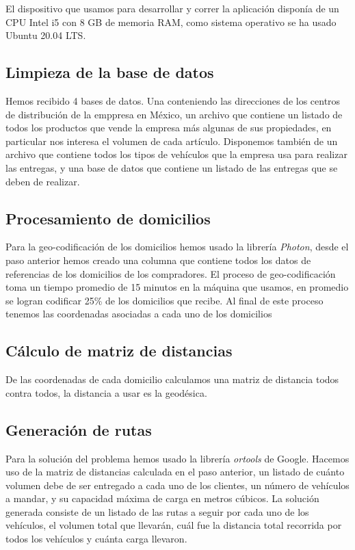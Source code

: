 \documentclass[journal]{IEEEtran}
\begin{document}
        El dispositivo que usamos para desarrollar y correr la aplicación disponía de un CPU Intel i5 con 8 GB de memoria RAM, como sistema operativo se ha usado Ubuntu 20.04 LTS.
    
        \subsection{Limpieza de la base de datos} \label{stage 1}
            
            Hemos recibido 4 bases de datos. Una conteniendo las direcciones de los centros de distribución de la emppresa en México, un archivo que contiene un listado de todos los productos que vende la empresa más algunas de sus propiedades, en particular nos interesa el volumen de cada artículo. Disponemos también de un archivo que contiene todos los tipos de vehículos que la empresa usa para realizar las entregas, y una base de datos que contiene un listado de las entregas que se deben de realizar.
            
        \subsection{Procesamiento de domicilios} \label{stage 2}
        
            Para la geo-codificación de los domicilios hemos usado la librería \emph{Photon}, desde el paso anterior hemos creado una columna que contiene todos los datos de referencias de los domicilios de los compradores. El proceso de geo-codificación toma un tiempo promedio de 15 minutos en la máquina que usamos, en promedio se logran codificar 25\% de los domicilios que recibe. Al final de este proceso tenemos las coordenadas asociadas a cada uno de los domicilios

        \subsection{Cálculo de matriz de distancias} \label{stage 3}
            
            De las coordenadas de cada domicilio calculamos una matriz de distancia todos contra todos, la distancia a usar es la geodésica.

        \subsection{Generación de rutas} \label{stage 4}
        
            Para la solución del problema hemos usado la librería \emph{ortools} de Google. Hacemos uso de la matriz de distancias calculada en el paso anterior, un listado de cuánto volumen debe de ser entregado a cada uno de los clientes, un número de vehículos a mandar, y su capacidad máxima de carga en metros cúbicos. La solución generada consiste de un listado de las rutas a seguir por cada uno de los vehículos, el volumen total que llevarán, cuál fue la distancia total recorrida por todos los vehículos y cuánta carga llevaron.
\end{document}
